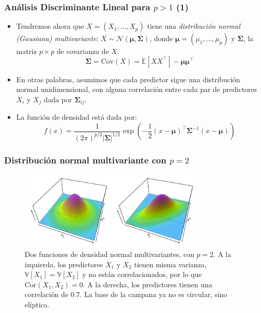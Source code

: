 \documentclass[usenames,dvipsnames]{beamer} %
\newcommand\defi[1]{\textcolor{NavyBlue}{\textit{#1}}}
\begin{document}
\begin{frame}\frametitle{An\'alisis Discriminante Lineal para $p>1$ (1)}
\begin{itemize}
	\item Tendremos ahora que $X=(X_1, \dotsc, X_p)$ tiene una \defi{distribuci\'on normal (Gausiana) multivariante}: $X\sim\mathcal{N}(\bm{\mu},\bm{\Sigma})$, donde $\bm{\mu}=(\mu_1,\dotsc, \mu_p)$ y $\bm{\Sigma}$, la matriz $p\times p$ de covarianza de $X$: \[\bm \Sigma=\text{Cov}(X)=\mathbb{E}\left [X X^\top\right ]-\bm \mu \bm \mu^\top\]
	\item En otras palabras, asumimos que cada predictor sigue una distribuci\'on normal unidimensional, con alguna correlaci\'on entre cada par de predictores $X_i$ y $X_j$ dada por $\bm\Sigma_{ij}$.
	\item La funci\'on de densidad est\'a dada por:
	\begin{equation}\label{eq:islr_4-18}
	f(x) = \frac{1}{(2\pi)^{p/2}|\bm\Sigma|^{1/2}}\exp{\left( -\frac{1}{2} (x-\bm \mu)^{\top}\bm \Sigma^{-1}(x-\bm \mu) \right)}
	\end{equation}
\end{itemize}
\end{frame}

\begin{frame}\frametitle{Distribuci\'on normal multivariante con $p=2$}
\begin{figure}
	\centering
	\includegraphics[width=0.8\textwidth]{images/islr/fig_4_5.png}
	\caption{Dos funciones de densidad normal multivariantes, con $p=2$. A la izquierda, los predictores $X_1$ y $X_2$ tienen misma varianza, $\mathbb{V}[X_1]=\mathbb{V}[X_2]$ y no est\'an correlacionados, por lo que $\text{Cor}(X_1, X_2)=0$. A la derecha, los predictores tienen una correlaci\'on de $0.7$. La base de la campana ya no es circular, sino el\'iptica.}
	\label{fig:islr_4-5}
\end{figure}
\end{frame}
\end{document}
